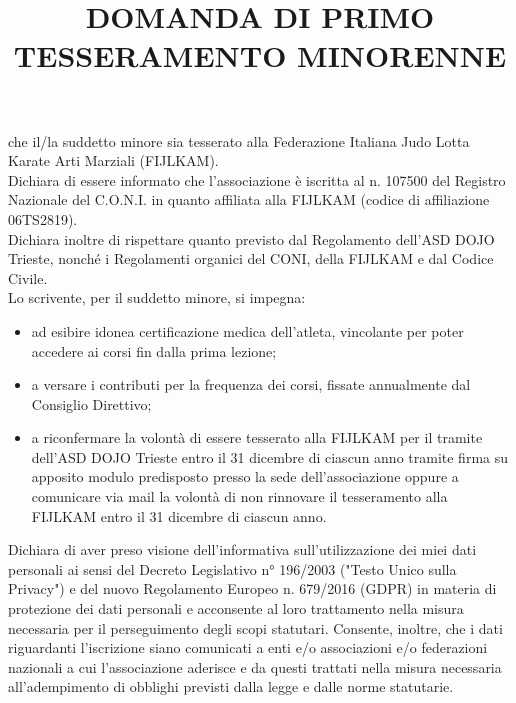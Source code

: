\documentclass[
	headerstyle = TitleDojoFijlkam
]{djtsmod}
\title{DOMANDA DI PRIMO TESSERAMENTO MINORENNE}
\begin{document}
	\maketitle
	
	
	\basedata
	
	\vspace{0.2in}
	\childbasedata
	
	che il/la suddetto minore sia tesserato alla Federazione Italiana Judo Lotta Karate Arti Marziali (FIJLKAM). \\[10pt]
	Dichiara di essere informato che l’associazione è iscritta al n. 107500 del Registro Nazionale del C.O.N.I. in quanto affiliata alla FIJLKAM (codice di affiliazione 06TS2819). \\[10pt]
	Dichiara inoltre di rispettare quanto previsto dal Regolamento dell'ASD DOJO Trieste, nonché i Regolamenti organici del CONI, della FIJLKAM e dal Codice Civile. \\
	Lo scrivente, per il suddetto minore, si impegna:
	\begin{itemize}
		\item ad esibire idonea certificazione medica dell'atleta, vincolante per poter accedere ai corsi fin dalla prima lezione;
		\item a versare i contributi per la frequenza dei corsi, fissate annualmente dal Consiglio Direttivo;
		\item a riconfermare la volontà di essere tesserato alla FIJLKAM per il tramite dell'ASD DOJO Trieste entro il 31 dicembre di ciascun anno tramite firma su apposito modulo predisposto presso la sede dell'associazione oppure a comunicare via mail la volontà di non rinnovare il tesseramento alla FIJLKAM entro il 31 dicembre di ciascun anno.
	\end{itemize}
	Dichiara di aver preso visione dell'informativa sull'utilizzazione dei miei dati personali ai sensi del Decreto Legislativo n° 196/2003 ("Testo Unico sulla Privacy") e del nuovo Regolamento Europeo n. 679/2016 (GDPR) in materia di protezione dei dati personali e acconsente al loro trattamento nella misura necessaria per il perseguimento degli scopi statutari. Consente, inoltre, che i dati riguardanti l’iscrizione siano comunicati a enti e/o associazioni e/o federazioni nazionali a cui l’associazione aderisce e da questi trattati nella misura necessaria all'adempimento di obblighi previsti dalla legge e dalle norme statutarie.
	
	\vspace{0.3in}
	
	
\end{document}
